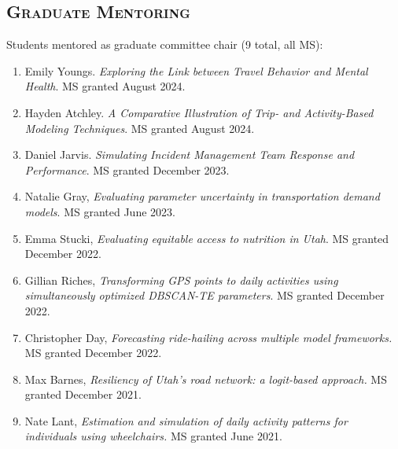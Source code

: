 \documentclass[margin,line]{res}
\newif\ifdetail
\newcounter{enuminitialize}
\newenvironment{myenum}[1][]
{%
 \setcounter{enuminitialize}{#1}
 \addtocounter{enuminitialize}{2}
 \begin{enumerate}[left= 4pt, itemsep=8pt, start=\value{enuminitialize}, label=\arabic*\addtocounter{enumi}{-2}]
}
{%
 \end{enumerate}
}
\newcommand{\secfont}{\scshape }
\begin{document}
\begin{resume}
\section{\secfont Graduate Mentoring}
Students mentored as graduate committee chair (9 total, all MS):
\vspace{0.3cm}
\begin{myenum}[9]
  \ifdetail {\color{NavyBlue} \fi
  \item Emily Youngs. \textit{Exploring the Link between Travel Behavior and Mental Health}. MS granted August 2024.
  \item Hayden Atchley. \textit{A Comparative Illustration of Trip- and Activity-Based Modeling Techniques}. MS granted August 2024.
  \item Daniel Jarvis. \textit{Simulating Incident Management Team Response and Performance}. MS granted December 2023.
  \item Natalie Gray, \textit{Evaluating parameter uncertainty in transportation demand models}. MS granted June 2023.
  \item Emma Stucki, \textit{Evaluating equitable access to nutrition in Utah}. MS granted December 2022.
  \item Gillian Riches, \textit{Transforming GPS points to daily activities using simultaneously optimized DBSCAN-TE parameters}. MS granted December 2022.
  \item Christopher Day, \textit{Forecasting ride-hailing across multiple model frameworks.} MS granted December 2022.
  \ifdetail } \fi
  \item Max Barnes, \textit{Resiliency of Utah's road network: a logit-based approach.} MS granted December 2021.
  \item Nate Lant, \textit{Estimation and simulation of daily activity patterns for individuals using wheelchairs.} MS granted June 2021.
\end{myenum}


\end{resume}
\end{document}
